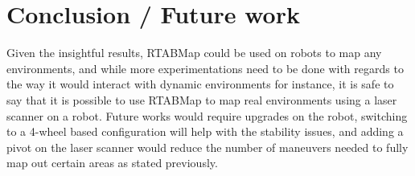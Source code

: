 \documentclass[10pt,journal,compsoc]{IEEEtran}
\begin{document}
\section{Conclusion / Future work}
Given the insightful results, RTABMap could be used on
robots to map any environments, and while more experimentations need to be done with regards to the way it
would interact with dynamic environments for instance, it
is safe to say that it is possible to use RTABMap to map real
environments using a laser scanner on a robot.
Future works would require upgrades on the robot,
switching to a 4-wheel based configuration will help with
the stability issues, and adding a pivot on the laser scanner
would reduce the number of maneuvers needed to fully
map out certain areas as stated previously. 


%
\end{document}
